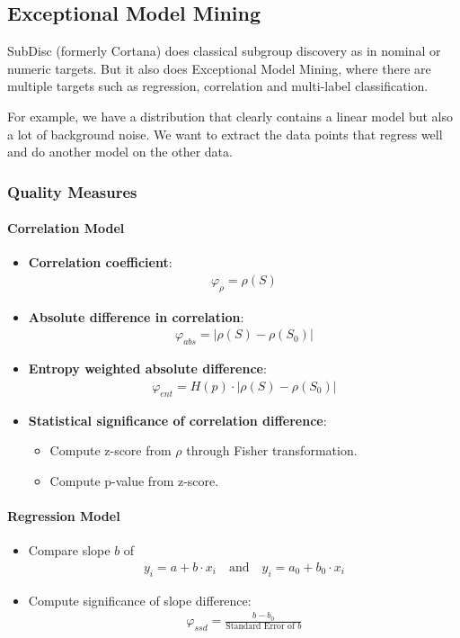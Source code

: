 \subsection{Exceptional Model Mining}

SubDisc (formerly Cortana) does classical subgroup discovery
as in nominal or numeric targets. But it also does Exceptional
Model Mining, where there are multiple targets such as regression,
correlation and multi-label classification.

For example, we have a distribution that clearly contains a linear
model but also a lot of background noise. We want to extract the
data points that regress well and do another model on the other
data.

\subsubsection{Quality Measures}

\paragraph{Correlation Model}
\begin{itemize}
  \item \textbf{Correlation coefficient}:
    \begin{align*}
      \varphi_\rho = \rho(S)
    \end{align*}
  \item \textbf{Absolute difference in correlation}:
    \begin{align*}
      \varphi_{abs} = | \rho(S) - \rho(S_0) |
    \end{align*}
  \item \textbf{Entropy weighted absolute difference}:
    \begin{align*}
      \varphi_{ent} = H(p) \cdot | \rho(S) - \rho(S_0) |
    \end{align*}
  \item \textbf{Statistical significance of correlation difference}:
    \begin{itemize}
      \item Compute z-score from \( \rho \) through Fisher transformation.
      \item Compute p-value from z-score.
    \end{itemize}
\end{itemize}

\paragraph{Regression Model}
\begin{itemize}
  \item Compare slope \( b \) of
    \begin{align*}
      y_i = a + b \cdot x_i \quad \text{and} \quad y_i = a_0 + b_0 \cdot x_i
    \end{align*}
  \item Compute significance of slope difference:
    \begin{align*}
      \varphi_{ssd} = \frac{b - b_0}{\text{Standard Error of } b}
    \end{align*}
\end{itemize}

